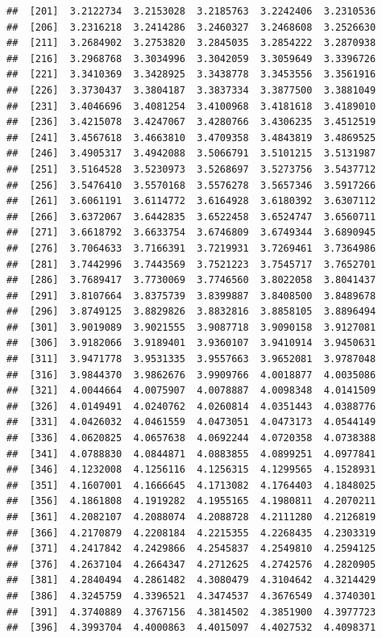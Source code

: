 \documentclass[
  11pt]{report}
\begin{document}
\begin{itemize}
\begin{verbatim}
##  [201]  3.2122734  3.2153028  3.2185763  3.2242406  3.2310536
##  [206]  3.2316218  3.2414286  3.2460327  3.2468608  3.2526630
##  [211]  3.2684902  3.2753820  3.2845035  3.2854222  3.2870938
##  [216]  3.2968768  3.3034996  3.3042059  3.3059649  3.3396726
##  [221]  3.3410369  3.3428925  3.3438778  3.3453556  3.3561916
##  [226]  3.3730437  3.3804187  3.3837334  3.3877500  3.3881049
##  [231]  3.4046696  3.4081254  3.4100968  3.4181618  3.4189010
##  [236]  3.4215078  3.4247067  3.4280766  3.4306235  3.4512519
##  [241]  3.4567618  3.4663810  3.4709358  3.4843819  3.4869525
##  [246]  3.4905317  3.4942088  3.5066791  3.5101215  3.5131987
##  [251]  3.5164528  3.5230973  3.5268697  3.5273756  3.5437712
##  [256]  3.5476410  3.5570168  3.5576278  3.5657346  3.5917266
##  [261]  3.6061191  3.6114772  3.6164928  3.6180392  3.6307112
##  [266]  3.6372067  3.6442835  3.6522458  3.6524747  3.6560711
##  [271]  3.6618792  3.6633754  3.6746809  3.6749344  3.6890945
##  [276]  3.7064633  3.7166391  3.7219931  3.7269461  3.7364986
##  [281]  3.7442996  3.7443569  3.7521223  3.7545717  3.7652701
##  [286]  3.7689417  3.7730069  3.7746560  3.8022058  3.8041437
##  [291]  3.8107664  3.8375739  3.8399887  3.8408500  3.8489678
##  [296]  3.8749125  3.8829826  3.8832816  3.8858105  3.8896494
##  [301]  3.9019089  3.9021555  3.9087718  3.9090158  3.9127081
##  [306]  3.9182066  3.9189401  3.9360107  3.9410914  3.9450631
##  [311]  3.9471778  3.9531335  3.9557663  3.9652081  3.9787048
##  [316]  3.9844370  3.9862676  3.9909766  4.0018877  4.0035086
##  [321]  4.0044664  4.0075907  4.0078887  4.0098348  4.0141509
##  [326]  4.0149491  4.0240762  4.0260814  4.0351443  4.0388776
##  [331]  4.0426032  4.0461559  4.0473051  4.0473173  4.0544149
##  [336]  4.0620825  4.0657638  4.0692244  4.0720358  4.0738388
##  [341]  4.0788830  4.0844871  4.0883855  4.0899251  4.0977841
##  [346]  4.1232008  4.1256116  4.1256315  4.1299565  4.1528931
##  [351]  4.1607001  4.1666645  4.1713082  4.1764403  4.1848025
##  [356]  4.1861808  4.1919282  4.1955165  4.1980811  4.2070211
##  [361]  4.2082107  4.2088074  4.2088728  4.2111280  4.2126819
##  [366]  4.2170879  4.2208184  4.2215355  4.2268435  4.2303319
##  [371]  4.2417842  4.2429866  4.2545837  4.2549810  4.2594125
##  [376]  4.2637104  4.2664347  4.2712625  4.2742576  4.2820905
##  [381]  4.2840494  4.2861482  4.3080479  4.3104642  4.3214429
##  [386]  4.3245759  4.3396521  4.3474537  4.3676549  4.3740301
##  [391]  4.3740889  4.3767156  4.3814502  4.3851900  4.3977723
##  [396]  4.3993704  4.4000863  4.4015097  4.4027532  4.4098371

\end{verbatim}
\end{itemize}
\end{document}
